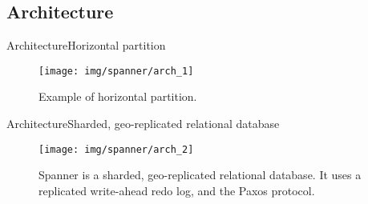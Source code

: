 \documentclass[10pt]{beamer}
\newcommand{\1}{
        	\setbeamertemplate{background}{
        		\texttt{[image: img/1]}
        		\tikz[overlay] \fill[fill opacity=0.75,fill=white] (0,0) rectangle (-\paperwidth,\paperheight);
        	}
}
\begin{document}
\subsection{Architecture}

\begin{frame}{Architecture}{Horizontal partition}
	\begin{figure}[]
		\centering
		\texttt{[image: img/spanner/arch\_1]}
		\label{img:mot2}
		\caption{Example of horizontal partition.}
	\end{figure}
\end{frame}

\begin{frame}{Architecture}{Sharded, geo-replicated relational database}
	\begin{figure}[]
		\centering
		\texttt{[image: img/spanner/arch\_2]}
		\label{img:mot2}
		\caption{Spanner is a sharded, geo-replicated relational database. It uses a replicated write-ahead redo log, and the Paxos protocol.}
	\end{figure}
\end{frame}

\end{document}
